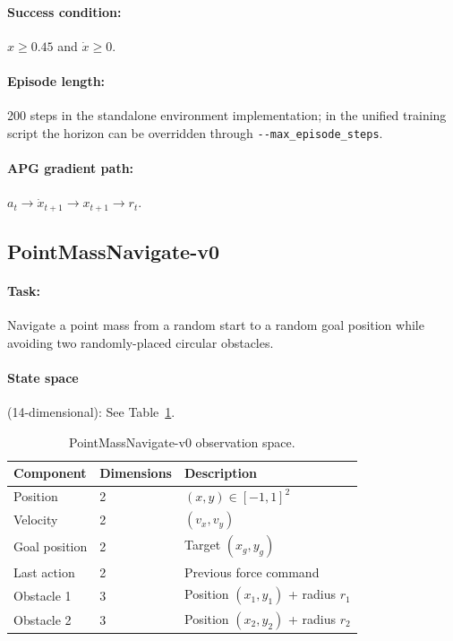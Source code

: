 \documentclass[11pt,a4paper]{article}
\begin{document}
\paragraph{Success condition:} $x \ge 0.45$ and $\dot{x} \ge 0$.

\paragraph{Episode length:} 200 steps in the standalone environment implementation; in the unified training script the horizon can be overridden through \texttt{-{}-max\_episode\_steps}.

\paragraph{APG gradient path:} $a_t \rightarrow \dot{x}_{t+1} \rightarrow x_{t+1} \rightarrow r_t$.

\subsection{PointMassNavigate-v0}
\label{sec:env_pointmass}

\paragraph{Task:} Navigate a point mass from a random start to a random goal position while avoiding two randomly-placed circular obstacles.

\paragraph{State space} (14-dimensional): See Table~\ref{tab:pm_obs}.

\begin{table}[htbp]
  \centering
  \caption{PointMassNavigate-v0 observation space.}
  \label{tab:pm_obs}
  \begin{tabular}{@{}lll@{}}
    \toprule
    \textbf{Component} & \textbf{Dimensions} & \textbf{Description} \\
    \midrule
    Position       & 2 & $(x, y) \in [-1, 1]^2$ \\
    Velocity       & 2 & $(v_x, v_y)$ \\
    Goal position  & 2 & Target $(x_g, y_g)$ \\
    Last action    & 2 & Previous force command \\
    Obstacle 1     & 3 & Position $(x_1, y_1)$ + radius $r_1$ \\
    Obstacle 2     & 3 & Position $(x_2, y_2)$ + radius $r_2$ \\
    \bottomrule
  \end{tabular}
\end{table}
\end{document}
